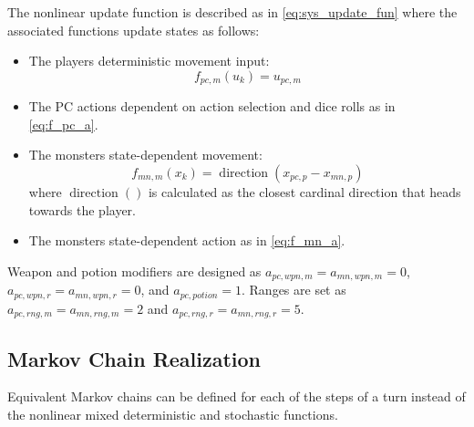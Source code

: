 \documentclass[letterpaper, 10 pt, conference]{ieeeconf}
\begin{document}
The nonlinear update function is described as in \eqref{eq:sys_update_fun}
where the associated functions update states as follows: 
\begin{itemize}
    \item The players deterministic movement input: \[
        f_{pc,m}(u_k) = u_{pc,m}
    \]
    \item The PC actions dependent on action selection and dice rolls as in \eqref{eq:f_pc_a}. 


    \item The monsters state-dependent movement:\[
        f_{mn,m}(x_k) = \operatorname{direction}(x_{pc,p} - x_{mn,p})
    \] where $\operatorname{direction}()$ is calculated as the closest cardinal direction that heads towards the player.
    \item The monsters state-dependent action as in \eqref{eq:f_mn_a}.
\end{itemize}


Weapon and potion modifiers are designed as $a_{pc,wpn,m} = a_{mn,wpn,m} = 0$, $a_{pc,wpn,r} = a_{mn,wpn,r} = 0$, and $a_{pc,potion} = 1$.
Ranges are set as $a_{pc,rng,m}= a_{mn,rng,m} = 2$ and $ a_{pc,rng,r} =  a_{mn,rng,r} = 5$.

\subsection{Markov Chain Realization}
Equivalent Markov chains can be defined for each of the steps of a turn instead of the nonlinear mixed deterministic and stochastic functions. 
\end{document}
